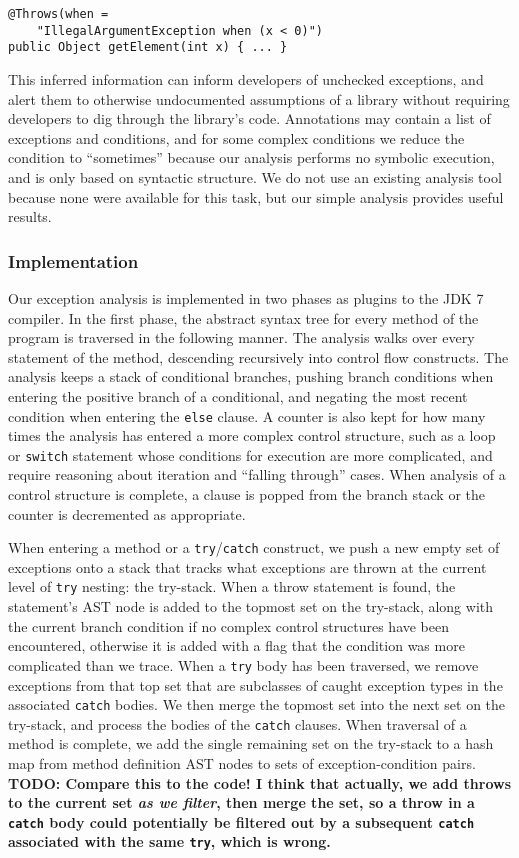 \begin{verbatim}
@Throws(when =
    "IllegalArgumentException when (x < 0)")
public Object getElement(int x) { ... }
\end{verbatim}

This inferred information can inform developers of unchecked exceptions,
and alert them to otherwise undocumented assumptions of a library without
requiring developers to dig through the library's code.
Annotations may contain a list of exceptions and conditions, and for some
complex conditions we reduce the condition to ``sometimes'' because our analysis
performs no symbolic execution, and is only based on syntactic structure.  We do not use an
existing analysis tool because none were available for this task, but our
simple analysis provides useful results.

\subsubsection{Implementation}

Our exception analysis is implemented in two phases as plugins to the JDK 7 compiler.
In the first phase, the
abstract syntax tree for every method of the program is traversed in the
following manner.  The analysis walks over every statement of the method,
descending recursively into control flow constructs.  The analysis keeps a stack
of conditional branches, pushing branch conditions when entering the positive
branch of a conditional, and negating the most recent condition when entering
the \texttt{else} clause.  A counter is also kept for how many times the
analysis has entered a more complex control structure, such as a loop or
\texttt{switch} statement whose conditions for execution are more complicated,
and require reasoning about iteration and ``falling through'' cases.  When
analysis of a control structure is complete, a clause is popped from the
branch stack or the counter is decremented as appropriate.

When entering a method or a \texttt{try}/\texttt{catch} construct, we push a new empty set of exceptions onto
a stack that tracks what exceptions are thrown at the current level of
\texttt{try} nesting: the try-stack.
When a throw statement is found, the statement's AST node is added to the
topmost set on the try-stack, 
along with the current branch condition if no complex control structures have
been encountered, otherwise it is added with a flag that the condition was more
complicated than we trace.  When a \texttt{try} body has been traversed, we
remove exceptions from that top set that are subclasses of caught exception
types in the associated \texttt{catch} bodies.  We then merge the topmost set
into the next set on the try-stack, and process the bodies of
the \texttt{catch} clauses.  When traversal of a method is complete, we add the
single remaining set on the try-stack to a hash map from method definition AST
nodes to sets of exception-condition pairs.
{\bf\large TODO: Compare this to the code! I think that actually, we add throws to
the current set \emph{as we filter}, then merge the set, so a throw in a
\texttt{catch}
body could potentially be filtered out by a subsequent \texttt{catch} associated with the
same \texttt{try}, which is wrong.}

